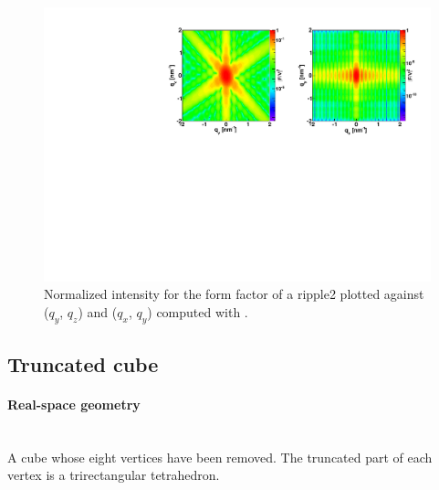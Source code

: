 \begin{figure}[ht]
\begin{center}
\includegraphics[angle=-90,width=\textwidth]{fig/ff/figffripple2.pdf}
\end{center}
\caption{Normalized intensity for the form factor of a ripple2 plotted against ($q_y$, $q_z$) and  ($q_x$, $q_y$)
  computed with .}
\label{fig:FFripple2Ex}
\end{figure}

\newpage
\subsection{Truncated cube}   

\paragraph{Real-space geometry}\strut\\
A cube whose eight vertices have been removed. The truncated part of each vertex is a trirectangular tetrahedron.

